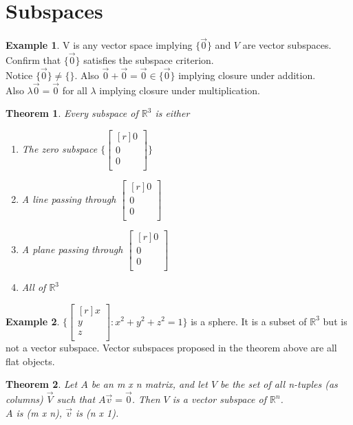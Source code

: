 \documentclass{report}
\theoremstyle{plain}
\newtheorem*{thrm}{Theorem}
\theoremstyle{definition}
\newtheorem*{ex}{Example}
\theoremstyle{plain}
\begin{document}
\section{Subspaces}
\begin{ex} V is any vector space implying $\{\vec{0}\}$ and $V$ are vector subspaces.\\
Confirm that $\{\vec{0}\}$ satisfies the subspace criterion.\\
Notice $\{\vec{0}\} \neq \{\}$. Also $\vec{0} + \vec{0} = \vec{0}\in \{\vec{0}\}$ implying closure under addition.\\
Also $\lambda\vec{0} = \vec{0}$ for all $\lambda$ implying closure under multiplication.
\end{ex}
\begin{thrm}
Every subspace of $\mathbb{R}^3$ is either
	\begin{enumerate}
	\item [0-D] The zero subspace $\{\begin{bmatrix}[r] 0\\ 0\\ 0\\ \end{bmatrix} \}$
	\item [1-D] A line passing through $\begin{bmatrix}[r] 0\\ 0\\ 0\\ \end{bmatrix}$
	\item [2-D] A plane passing through $\begin{bmatrix}[r] 0\\ 0\\ 0\\ \end{bmatrix}$
	\item [3-D] All of $\mathbb{R}^3$
	\end{enumerate}
\end{thrm}
\begin{ex}
$\{\begin{bmatrix}[r] x\\ y\\ z\\ \end{bmatrix} : x^2+y^2+z^2=1 \}$ is a sphere. It is a subset of $\mathbb{R}^3$ but is not a vector subspace. Vector subspaces proposed in the theorem above are all flat objects.
\end{ex}
\begin{thrm}
Let $A$ be an m x n matrix, and let $V$ be the set of all n-tuples (as columns) $\vec{V}$ such that $A\vec{v} = \vec{0}$. Then $V$ is a vector subspace of $\mathbb{R}^n$.\\
$A$ is (m x n), $\vec{v}$ is (n x 1).
\end{thrm}
\end{document}
